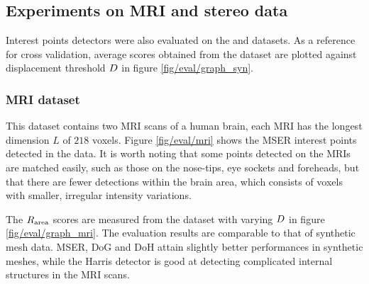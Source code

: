 \subsection{Experiments on MRI and stereo data}

Interest points detectors were also evaluated on the \mriset and \stereoset datasets. As a reference for cross validation, average scores obtained from the \meshset dataset are plotted against displacement threshold $D$ in figure \ref{fig/eval/graph_syn}. 

\subsubsection{MRI dataset} This dataset contains two MRI scans of a human brain, each MRI has the longest dimension $L$ of $218$ voxels.
Figure \ref{fig/eval/mri} shows the MSER interest points detected in the data. It is worth noting that some points detected on the MRIs are matched easily, such as those on the nose-tips, eye sockets and foreheads, but that there are fewer detections within the brain area, which consists of voxels with smaller, irregular intensity variations.

The $R_\textrm{area}$ scores are measured from the \mriset dataset with varying $D$ in figure \ref{fig/eval/graph_mri}. The evaluation results are comparable to that of synthetic mesh data. MSER, DoG and DoH attain slightly better performances in synthetic meshes, while the Harris detector is good at detecting complicated internal structures in the MRI scans. 

